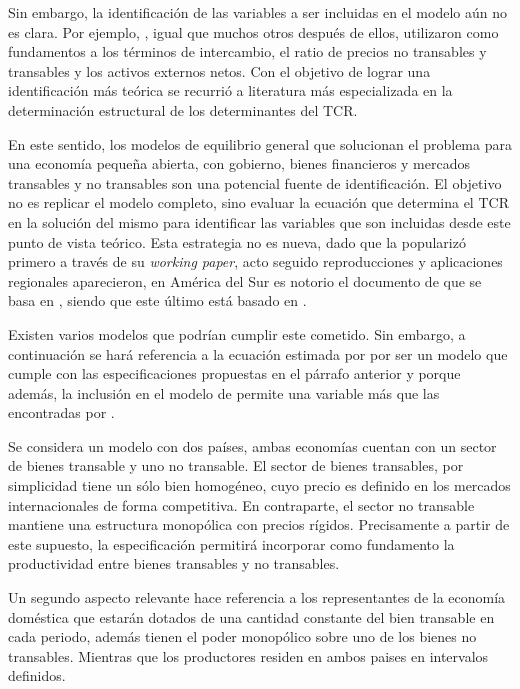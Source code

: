 \documentclass[12pt,letterpaper]{article}
\begin{document}
Sin embargo, la identificación de las variables a ser incluidas en el modelo aún no es clara. Por ejemplo, \cite{clark1999exchange}, igual que muchos otros después de ellos, utilizaron como fundamentos a los términos de intercambio, el ratio de precios no transables y transables y los activos externos netos. Con el objetivo de lograr una identificación más teórica se recurrió a literatura más especializada en la determinación estructural de los determinantes del TCR.

En este sentido, los modelos de equilibrio general que solucionan el problema para una economía pequeña abierta, con gobierno, bienes financieros y mercados transables y no transables son una potencial fuente de identificación. El objetivo no es replicar el modelo completo, sino evaluar la ecuación que determina el TCR en la solución del mismo para identificar las variables que son incluidas desde este punto de vista teórico. Esta estrategia no es nueva, dado que \cite{lane2004trans} la popularizó primero a través de su \emph{working paper}, acto seguido reproducciones y aplicaciones regionales aparecieron, en América del Sur es notorio el documento de \cite{Calderon2004exchange} que se basa en \cite{Calderon2002panel}, siendo que este último está basado en \cite{Obstfeld1995dynamics}.

Existen varios modelos que podrían cumplir este cometido. Sin embargo, a continuación se hará referencia a la ecuación estimada por \cite{Calderon2004exchange} por ser un modelo que cumple con las especificaciones propuestas en el párrafo anterior y porque además, la inclusión en el modelo de \cite{Calderon2002panel} permite una variable más que las encontradas por \cite{lane2004trans}.

Se considera un modelo con dos países, ambas economías cuentan con un sector de bienes transable y uno no transable. El sector de bienes transables, por simplicidad tiene un sólo bien homogéneo, cuyo precio es definido en los mercados internacionales de forma competitiva. En contraparte, el sector no transable mantiene una estructura monopólica con precios rígidos. Precisamente a partir de este supuesto, la especificación permitirá incorporar como fundamento la productividad entre bienes transables y no transables. 

Un segundo aspecto relevante hace referencia a los representantes de la economía doméstica que estarán dotados de una cantidad constante del bien transable en cada periodo, además tienen el poder monopólico sobre uno de los bienes no transables. Mientras que los productores residen en ambos paises en intervalos definidos. 
\end{document}
